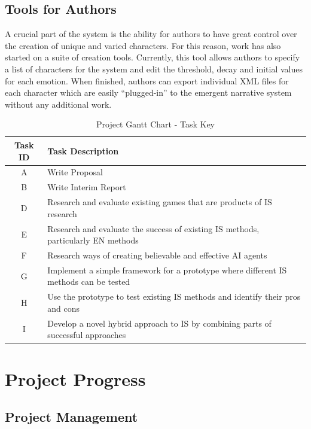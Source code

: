 \documentclass{sig-alternate-05-2015}
\begin{document}
\subsection{Tools for Authors}

\noindent A crucial part of the system is the ability for authors to have great control over the creation of unique and varied characters. For this reason, work has also started on a suite of creation tools. Currently, this tool allows authors to specify a list of characters for the system and edit the threshold, decay and initial values for each emotion. When finished, authors can export individual XML files for each character which are easily ``plugged-in'' to the emergent narrative system without any additional work.

\begin{table}
\centering
\caption{Project Gantt Chart - Task Key}
    \begin{tabular}{| c | p{13cm} |}
    \hline
    \textbf{Task ID} & \textbf{Task Description} \\ \hline
    \cellcolor{green!50}A & Write Proposal \\ \hline
    \cellcolor{green!50}B & Write Interim Report \\ \hline
    \cellcolor{green!50}D & Research and evaluate existing games that are products of IS research \\ \hline
    \cellcolor{green!50}E & Research and evaluate the success of existing IS methods, particularly EN methods \\ \hline
    \cellcolor{green!50}F & Research ways of creating believable and effective AI agents \\ \hline
    \cellcolor{orange!50}G & Implement a simple framework for a prototype where different IS methods can be tested \\ \hline
    \cellcolor{red!50}H & Use the prototype to test existing IS methods and identify their pros and cons \\ \hline
    \cellcolor{orange!50}I & Develop a novel hybrid approach to IS by combining parts of successful approaches \\ \hline
    \end{tabular}
\end{table}
\newpage
\section{Project Progress}
\subsection{Project Management}
\end{document}
